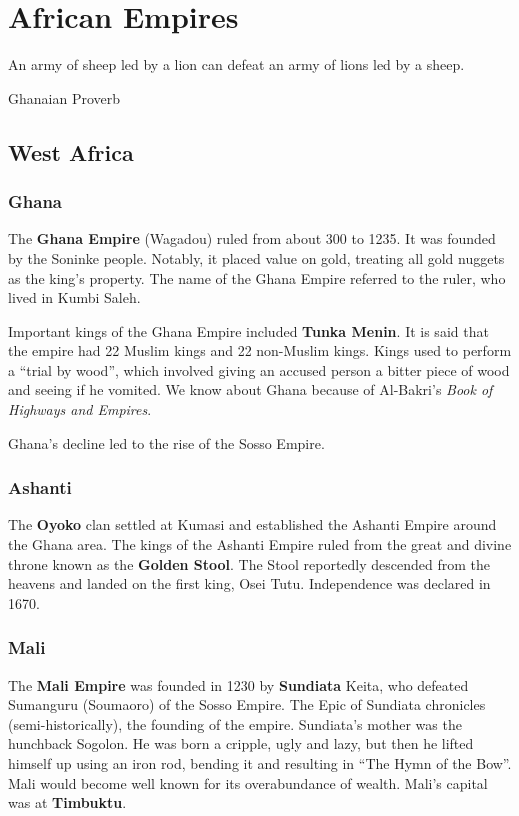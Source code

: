 \chapter{African Empires}

\epigraph{%
  An army of sheep led by a lion can defeat an army of lions led by a sheep.
}{Ghanaian Proverb}

\section{West Africa}

\subsection*{Ghana}

The \textbf{Ghana Empire} (Wagadou) ruled from about 300 to 1235.
It was founded by the Soninke people.
Notably, it placed value on gold, treating all gold nuggets as the king's property.
The name of the Ghana Empire referred to the ruler, who lived in Kumbi Saleh.

Important kings of the Ghana Empire included \textbf{Tunka Menin}.
It is said that the empire had 22 Muslim kings and 22 non-Muslim kings.
Kings used to perform a ``trial by wood'',
which involved giving an accused person a bitter piece of wood and seeing if he vomited.
We know about Ghana because of Al-Bakri's \textit{Book of Highways and Empires}.

Ghana's decline led to the rise of the Sosso Empire.

\subsection*{Ashanti}

The \textbf{Oyoko} clan settled at Kumasi and established the Ashanti Empire around the Ghana area.
The kings of the Ashanti Empire ruled from the great and divine throne
known as the \textbf{Golden Stool}.
The Stool reportedly descended from the heavens and landed on the first king, Osei Tutu.
Independence was declared in 1670.

\subsection*{Mali}

The \textbf{Mali Empire} was founded in 1230 by \textbf{Sundiata} Keita,
who defeated Sumanguru (Soumaoro) of the Sosso Empire.
The Epic of Sundiata chronicles (semi-historically), the founding of the empire.
Sundiata's mother was the hunchback Sogolon.
He was born a cripple, ugly and lazy,
but then he lifted himself up using an iron rod,
bending it and resulting in ``The Hymn of the Bow''.
Mali would become well known for its overabundance of wealth.
Mali's capital was at \textbf{Timbuktu}.

